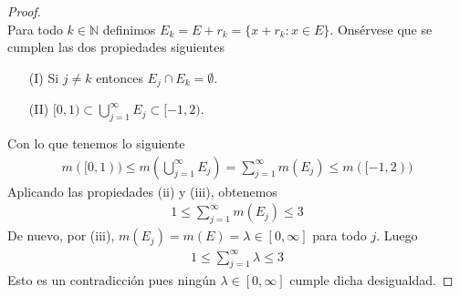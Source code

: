 \begin{proof}
\\
\newline
Para todo $k \in \mathbb{N}$ definimos $E_k = E + r_k = \{x + r_k : x \in E \}$. Onsérvese que se cumplen las dos propiedades siguientes
\begin{enumerate}
    \item[(I)] Si $j \not = k$ entonces $E_j \cap E_k = \emptyset$.
    \item[(II)] $[0,1) \subset \bigcup_{j=1}^{\infty}{E_j} \subset [-1,2)$. 
\end{enumerate}
Con lo que tenemos lo siguiente
\begin{align*}
    m([0,1)) \leq m\left( \bigcup_{j=1}^{\infty}{E_j} \right) = \sum_{j=1}^{\infty}{m(E_j)} \leq m([-1,2))
\end{align*}
Aplicando las propiedades (ii) y (iii), obtenemos
\begin{align*}
    1 \leq \sum_{j=1}^{\infty}{m(E_j)} \leq 3
\end{align*}
De nuevo, por (iii), $m(E_j) = m(E) = \lambda \in [0,\infty]$ para todo $j$. Luego
\begin{align*}
    1 \leq \sum_{j=1}^{\infty}{\lambda} \leq 3
\end{align*}
Esto es un contradicción pues ningún $\lambda \in [0,\infty]$ cumple dicha desigualdad.
\end{proof}

